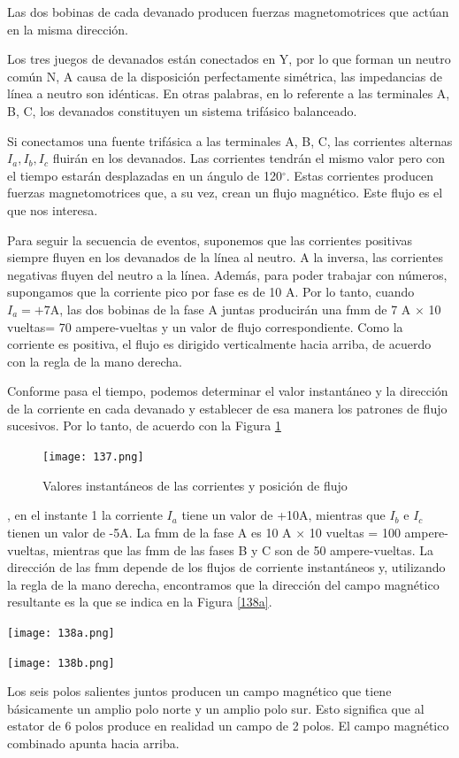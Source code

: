 \documentclass[a4paper,12pt]{article}
\begin{document}
Las dos bobinas de cada devanado producen fuerzas magnetomotrices que actúan en la misma dirección.

Los tres juegos de devanados están conectados en Y, por lo que forman un neutro común N, A causa de la disposición perfectamente simétrica, las impedancias de línea a neutro son idénticas. En otras palabras, en lo referente a las terminales A, B, C, los devanados constituyen un sistema trifásico balanceado.

Si conectamos una fuente trifásica a las terminales A, B, C, las corrientes alternas $I_{a}, I_{b}, I_{c}$ fluirán en los devanados. Las corrientes tendrán el mismo valor pero con el tiempo estarán desplazadas en un ángulo de 120$^{\circ}$. Estas corrientes producen fuerzas magnetomotrices que, a su vez, crean un flujo magnético. Este flujo es el que nos interesa.

Para seguir la secuencia de eventos, suponemos que las corrientes positivas siempre fluyen en los devanados de la línea al neutro. A la inversa, las corrientes negativas fluyen del neutro a la línea. Además, para poder trabajar con números, supongamos que la corriente pico por fase es de 10 A. Por lo tanto, cuando $I_{a} = +7$A, las dos bobinas de la fase A juntas producirán una fmm de 7 A $\times$ 10 vueltas= 70 ampere-vueltas y un valor de flujo correspondiente. Como la corriente es positiva, el flujo es dirigido verticalmente hacia arriba, de acuerdo con la regla de la mano derecha.

Conforme pasa el tiempo, podemos determinar el valor instantáneo y la dirección de la corriente en cada devanado y establecer de esa manera los patrones de flujo sucesivos. Por lo tanto, de acuerdo con la Figura \ref{137}
\begin{figure}
    \centering
    \texttt{[image: 137.png]}
    \caption{Valores instantáneos de las corrientes y posición de flujo}
    \label{137}
\end{figure}
, en el instante 1 la corriente $I_{a}$ tiene un valor de +10A, mientras que $I_{b}$ e $I_{c}$ tienen un valor de -5A. La fmm de la fase A es 10 A $\times$ 10 vueltas = 100 ampere-vueltas, mientras que las fmm de las fases B y C son de 50 ampere-vueltas. La dirección de las fmm depende de los flujos de corriente instantáneos y, utilizando la regla de la mano derecha, encontramos que la dirección del campo magnético resultante es la que se indica en la Figura \ref{138a}. 
\begin{center}
\begin{minipage}{0.45\textwidth}
\texttt{[image: 138a.png]}
\end{minipage}\hfill
\begin{minipage}{0.45\textwidth}
\texttt{[image: 138b.png]}
\end{minipage}
\label{138a}
\end{center}
Los seis polos salientes juntos producen un campo magnético que tiene básicamente un amplio polo norte y un amplio polo sur. Esto significa que al estator de 6 polos produce en realidad un campo de 2 polos. El campo magnético combinado apunta hacia arriba.
\end{document}

